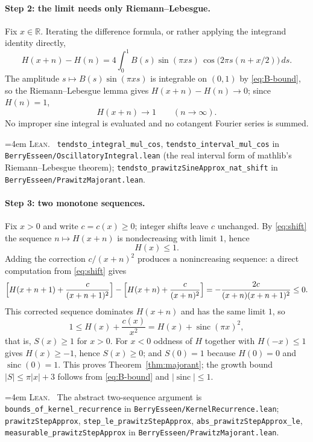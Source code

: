 \documentclass[10pt,a4paper]{article}
\theoremstyle{plain}
\theoremstyle{definition}
\newcommand{\R}{\mathbb{R}}
\newcommand{\lean}[1]{\texttt{#1}}
\newcommand{\file}[1]{\texttt{#1}}
\DeclareMathOperator{\sinc}{sinc}
\newenvironment{leanref}%
  {\par\addvspace{3pt}\begingroup\sloppy\emergencystretch=4em
   \noindent\footnotesize\textsc{Lean.}\ \ignorespaces}%
  {\par\endgroup\addvspace{3pt}}
\begin{document}
\paragraph{Step 2: the limit needs only Riemann--Lebesgue.}
Fix $x\in\R$. Iterating the difference formula, or rather applying the
integrand identity directly,
\[
  H(x+n)-H(n)
  = 4\int_0^1 B(s)\sin(\pi xs)\,\cos\bigl(2\pi s(n+x/2)\bigr)\,ds .
\]
The amplitude $s\mapsto B(s)\sin(\pi xs)$ is integrable on $(0,1)$ by
\eqref{eq:B-bound}, so the Riemann--Lebesgue lemma gives
$H(x+n)-H(n)\to0$; since $H(n)=1$,
\[
  H(x+n) \longrightarrow 1 \qquad (n\to\infty).
\]
No improper sine integral is evaluated and no cotangent Fourier series is
summed.

\begin{leanref}
\lean{tendsto\_integral\_mul\_cos}, \lean{tendsto\_interval\_mul\_cos} in
\file{BerryEsseen/OscillatoryIntegral.lean} (the real interval form of
mathlib's Riemann--Lebesgue theorem);
\lean{tendsto\_prawitzSineApprox\_nat\_shift} in
\file{BerryEsseen/PrawitzMajorant.lean}.
\end{leanref}

\paragraph{Step 3: two monotone sequences.}
Fix $x>0$ and write $c=c(x)\ge0$; integer shifts leave $c$ unchanged. By
\eqref{eq:shift} the sequence $n\mapsto H(x+n)$ is nondecreasing with limit
$1$, hence
\[
  H(x)\le 1 .
\]
Adding the correction $c/(x+n)^2$ produces a nonincreasing sequence: a direct
computation from \eqref{eq:shift} gives
\[
  \Bigl[H(x+n+1)+\frac{c}{(x+n+1)^2}\Bigr]
  -\Bigl[H(x+n)+\frac{c}{(x+n)^2}\Bigr]
  = -\frac{2c}{(x+n)(x+n+1)^2} \le 0 .
\]
This corrected sequence dominates $H(x+n)$ and has the same limit $1$, so
\[
  1 \le H(x) + \frac{c(x)}{x^2} = H(x)+\sinc(\pi x)^2 ,
\]
that is, $S(x)\ge1$ for $x>0$. For $x<0$ oddness of $H$ together with
$H(-x)\le1$ gives $H(x)\ge-1$, hence $S(x)\ge0$; and $S(0)=1$ because
$H(0)=0$ and $\sinc(0)=1$. This proves Theorem~\ref{thm:majorant}; the growth
bound $|S|\le\pi|x|+3$ follows from \eqref{eq:B-bound} and
$|\sinc|\le1$.

\begin{leanref}
The abstract two-sequence argument is
\lean{bounds\_of\_kernel\_recurrence} in
\file{BerryEsseen/KernelRecurrence.lean}; \lean{prawitzStepApprox},
\lean{step\_le\_prawitzStepApprox}, \lean{abs\_prawitzStepApprox\_le},
\lean{measurable\_prawitzStepApprox} in
\file{BerryEsseen/PrawitzMajorant.lean}.
\end{leanref}
\end{document}

